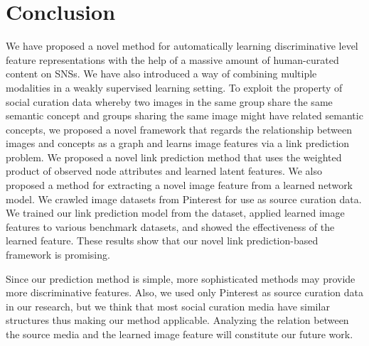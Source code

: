 \documentclass[letterpaper]{article} %
\begin{document}
\section{Conclusion}
\label{sec:conclude}

We have proposed a novel method for automatically learning discriminative level feature representations with the help of a massive amount of human-curated content on SNSs.
%
We have also introduced a way of combining multiple modalities in a weakly supervised learning setting.
%
To exploit the property of social curation data whereby two images in the same group share the same semantic concept and groups sharing the same image might have related semantic concepts, we proposed a novel framework that regards the relationship between images and concepts as a graph and learns image features via a link prediction problem.
%
We proposed a novel link prediction method that uses the weighted product of observed node attributes and learned latent features.
%
We also proposed a method for extracting a novel image feature from a learned network model.
%
We crawled image datasets from Pinterest for use as source curation data.
%
We trained our link prediction model from the dataset, applied learned image features to various benchmark datasets, and showed the effectiveness of the learned feature.
%
These results show that our novel link prediction-based framework is promising.

Since our prediction method is simple, more sophisticated methods may provide more discriminative features.
%
Also, we used only Pinterest as source curation data in our research, but we think that most social curation media have similar structures thus making our method applicable.
%
Analyzing the relation between the source media and the learned image feature will constitute our future work.






\end{document}
